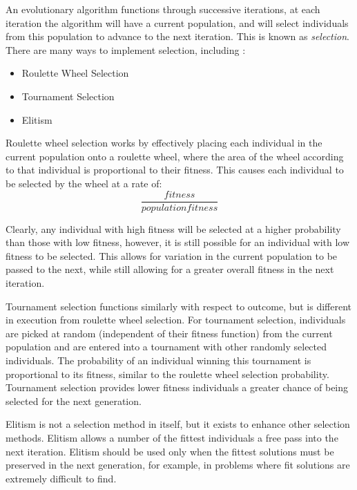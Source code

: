 \documentclass[a4paper, 12pt]{article}
\begin{document}
An evolutionary algorithm functions through successive iterations, at each iteration the algorithm will have a current population, and will select individuals from this population to advance to the next iteration. This is known as \textit{selection}. There are many ways to implement selection, including \cite{jebari_selection_2013}:

\begin{itemize}
\item Roulette Wheel Selection
\item Tournament Selection
\item Elitism
\end{itemize}

Roulette wheel selection works by effectively placing each individual in the current population onto a roulette wheel, where the area of the wheel according to that individual is proportional to their fitness. This causes each individual to be selected by the wheel at a rate of:
\begin{equation}
\frac{fitness}{population fitness}
\end{equation}

Clearly, any individual with high fitness will be selected at a higher probability than those with low fitness, however, it is still possible for an individual with low fitness to be selected. This allows for variation in the current population to be passed to the next, while still allowing for a greater overall fitness in the next iteration. 

Tournament selection functions similarly with respect to outcome, but is different in execution from roulette wheel selection. For tournament selection, individuals are picked at random (independent of their fitness function) from the current population and are entered into a tournament with other randomly selected individuals. The probability of an individual winning this tournament is proportional to its fitness, similar to the roulette wheel selection probability. Tournament selection provides lower fitness individuals a greater chance of being selected for the next generation.

Elitism is not a selection method in itself, but it exists to enhance other selection methods. Elitism allows a number of the fittest individuals a free pass into the next iteration. Elitism should be used only when the fittest solutions must be preserved in the next generation, for example, in problems where fit solutions are extremely difficult to find. 
\end{document}
